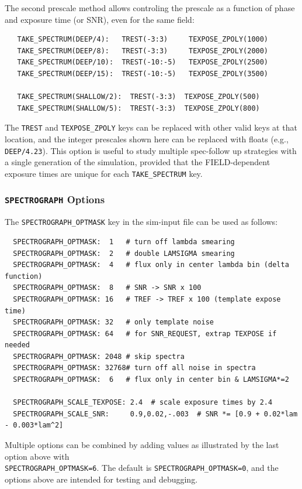 \documentclass[12pt]{article}
\newcommand{\SPEC}{{\tt SPECTROGRAPH}}
\begin{document}
The second prescale method allows controling the prescale as
a function of phase and exposure time (or SNR), even for the
same field:
\begin{verbatim} 
   TAKE_SPECTRUM(DEEP/4):   TREST(-3:3)     TEXPOSE_ZPOLY(1000)
   TAKE_SPECTRUM(DEEP/8):   TREST(-3:3)     TEXPOSE_ZPOLY(2000)
   TAKE_SPECTRUM(DEEP/10):  TREST(-10:-5)   TEXPOSE_ZPOLY(2500)
   TAKE_SPECTRUM(DEEP/15):  TREST(-10:-5)   TEXPOSE_ZPOLY(3500)

   TAKE_SPECTRUM(SHALLOW/2):  TREST(-3:3)  TEXPOSE_ZPOLY(500)
   TAKE_SPECTRUM(SHALLOW/5):  TREST(-3:3)  TEXPOSE_ZPOLY(800)
\end{verbatim}
%
The {\tt TREST} and {\tt TEXPOSE\_ZPOLY} keys can be replaced
with other valid keys at that location, and the integer prescales
shown here can be replaced with floats (e.g., {\tt DEEP/4.23}).
This option is useful to study multiple spec-follow up strategies 
with a single generation of the simulation, provided that the
FIELD-dependent exposure times are unique for each 
{\tt TAKE\_SPECTRUM} key.


\subsubsection{{\SPEC} Options}
\label{sss:SPEC_OPTMASK}

The {\tt SPECTROGRAPH\_OPTMASK} key in the sim-input file
can be used as follows:
%
\begin{verbatim}
  SPECTROGRAPH_OPTMASK:  1   # turn off lambda smearing
  SPECTROGRAPH_OPTMASK:  2   # double LAMSIGMA smearing
  SPECTROGRAPH_OPTMASK:  4   # flux only in center lambda bin (delta function)
  SPECTROGRAPH_OPTMASK:  8   # SNR -> SNR x 100
  SPECTROGRAPH_OPTMASK: 16   # TREF -> TREF x 100 (template expose time)
  SPECTROGRAPH_OPTMASK: 32   # only template noise
  SPECTROGRAPH_OPTMASK: 64   # for SNR_REQUEST, extrap TEXPOSE if needed
  SPECTROGRAPH_OPTMASK: 2048 # skip spectra
  SPECTROGRAPH_OPTMASK: 32768# turn off all noise in spectra
  SPECTROGRAPH_OPTMASK:  6   # flux only in center bin & LAMSIGMA*=2

  SPECTROGRAPH_SCALE_TEXPOSE: 2.4  # scale exposure times by 2.4
  SPECTROGRAPH_SCALE_SNR:     0.9,0.02,-.003  # SNR *= [0.9 + 0.02*lam - 0.003*lam^2]
\end{verbatim}
%
Multiple options can be combined by adding values
as illustrated by the last option above with \\
{\tt SPECTROGRAPH\_OPTMASK=6}.
The default is {\tt SPECTROGRAPH\_OPTMASK=0},
and the options above are intended for testing and debugging.
\end{document}
